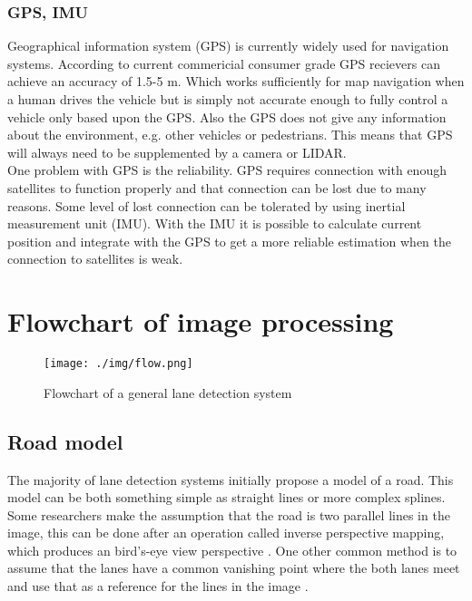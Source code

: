 \subsubsection{GPS, IMU}
Geographical information system (GPS) is currently widely used for navigation systems. According to \cite{wing2011} current commericial consumer grade GPS recievers can achieve an accuracy of 1.5-5 m. Which works sufficiently for map navigation when a human drives the vehicle but is simply not accurate enough to fully control a vehicle only based upon the GPS. Also the GPS does not give any information about the environment, e.g. other vehicles or pedestrians. This means that GPS will always need to be supplemented by a camera or LIDAR.\\
 
One problem with GPS is the reliability. GPS requires connection with enough satellites to function properly and that connection can be lost due to many reasons. Some level of lost connection can be tolerated by using inertial measurement unit (IMU). With the IMU it is possible to calculate current position and integrate with the GPS to get a more reliable estimation when the connection to satellites is weak.

\section{Flowchart of image processing}

\begin{figure}[H]
  \texttt{[image: ./img/flow.png]}
  \centering
  \caption{Flowchart of a general lane detection system}
  \label{fig:Software architecture of the EMC2 platform}
\end{figure}


\subsection{Road model}
The majority of lane detection systems initially propose a model of a road. This model can be both something simple as straight lines or more complex splines. Some researchers make the assumption that the road is two parallel lines in the image, this can be done after an operation called inverse perspective mapping, which produces an bird's-eye view  perspective \cite{bertozzi1998gold}. One other common method is to assume that the lanes have a common vanishing point where the both lanes meet and use that as a reference for the lines in the image \cite{Yenikaya:2013:KVR:2522968.2522970}\cite{jingyu2013lane}.
